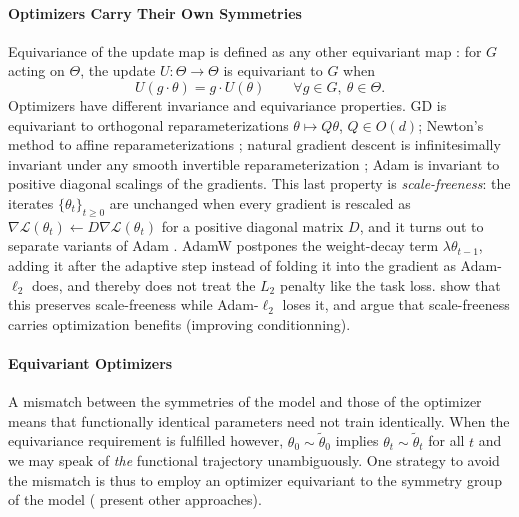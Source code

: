 \documentclass[mathematics,review,submit,moreauthors]{Definitions/mdpi}
\begin{document}
\paragraph{Optimizers Carry Their Own Symmetries}
Equivariance of the update map is defined as any other equivariant map \citep{neyshabur2015anips,yi2022ptcuai,yen2025iclr,zhao2025,yang2025}: for $G$ acting on $\Theta$, the update $U:\Theta\to\Theta$ is equivariant to $G$ when
\begin{equation}\label{eq:equivariant-optimizer}
    U(g\cdot\theta)=g\cdot U(\theta)\qquad\forall g\in G,\ \theta\in\Theta.
\end{equation}
Optimizers have different invariance and equivariance properties.
GD is equivariant to orthogonal reparameterizations $\theta\mapsto Q\theta$, $Q\in O(d)$; Newton's method to affine reparameterizations \citep{kristiadi2023anips}; natural gradient descent is infinitesimally invariant under any smooth invertible reparameterization \citep{amari1998nc,liang2019pticais,kristiadi2023anips,zhao2025}; Adam \citep{kingma2015} is invariant to positive diagonal scalings of the gradients.
This last property is \emph{scale-freeness}: the iterates $\{\theta_t\}_{t\geq0}$ are unchanged when every gradient is rescaled as $\nabla\mathcal{L}(\theta_t)\gets D\nabla\mathcal{L}(\theta_t)$ for a positive diagonal matrix $D$, and it turns out to separate variants of Adam \citep{zhuang2022tmlr}.
AdamW postpones the weight-decay term $\lambda\theta_{t-1}$, adding it after the adaptive step instead of folding it into the gradient as Adam-$\ell_2$ does, and thereby does not treat the $L_2$ penalty like the task loss.
\citet{zhuang2022tmlr} show that this preserves scale-freeness while Adam-$\ell_2$ loses it, and argue that scale-freeness carries optimization benefits (improving conditionning).

\paragraph{Equivariant Optimizers}
A mismatch between the symmetries of the model and those of the optimizer means that functionally identical parameters need not train identically.
When the equivariance requirement  is fulfilled however, $\theta_0\sim\tilde{\theta}_0$ implies $\theta_t\sim\tilde{\theta}_t$ for all $t$ and we may speak of \emph{the} functional trajectory unambiguously.
One strategy to avoid the mismatch is thus to employ an optimizer equivariant to the symmetry group of the model ( present other approaches).
\end{document}
